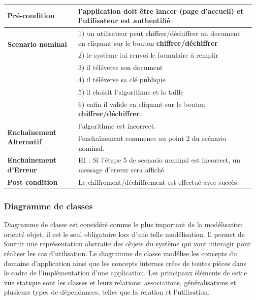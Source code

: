 \begin{enumerate}
\begin{table}[H]
\begin{tabular}{|l|p{11cm}|}
					\hline 
						\textbf{Pré-condition} & l'application doit être lancer (page d'accueil) et l'utilisateur est authentifié  \\ 
					\hline 
						\multirow{2}{*}{\textbf{Scenario nominal}} & 1) un utilisateur peut chiffrer/déchiffrer un document en cliquant sur le bouton  \textbf{chiffrer/déchiffrer} \\
							 & 2) le système lui renvoi le formulaire à remplir \\
							 & 3) il téléverse son document \\
							 & 4) il téléverse sa clé publique\\
							 & 5) il choisit l'algorithme et la taille\\
							 & 6) enfin il valide en cliquant sur le bouton \textbf{chiffrer/déchiffrer}.\\
					\hline 
					
						\multirow{2}{*}{\textbf{Enchaînement Alternatif}} & l'algorithme est incorrect. \\
							  & l'enchaînement commence au point 2 du scénario nominal. \\
							
					\hline 
						\textbf{Enchaînement d'Erreur} & E1 : Si l'étape 5 de scenario nominal est incorrect, un message d'erreur sera affiché. \\
					\hline
						\textbf{Post condition} & Le chiffrement/déchiffrement est effectué avec succès.\\
					\hline
					\end{tabular} 
				\end{table}
			\end{enumerate}
			
			
	\subsubsection{Diagramme de classes}
		Diagramme de classe est considéré comme le plus important de la modélisation orienté objet, il est le seul obligatoire lors d'une telle modélisation. Il permet de fournir une représentation abstraite des objets du système qui vont interagir pour réaliser les cas d'utilisation. Le diagramme de classe modélise les concepts du domaine d'application ainsi que les concepts internes crées de toutes pièces dans le cadre de l'implémentation d'une application. Les principaux éléments de cette vue statique sont les classes et leurs relations: associations, généralisations et plusieurs types de dépendances, telles que la relation et l'utilisation.
		
